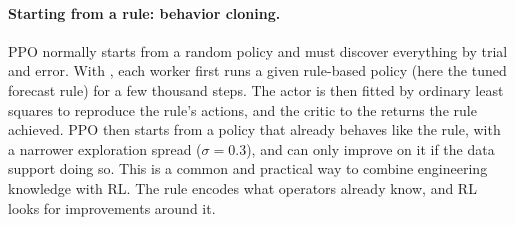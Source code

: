\paragraph{Starting from a rule: behavior cloning.} PPO normally starts from
a random policy and must discover everything by trial and error. With
, each worker first runs a given rule-based policy (here
the tuned forecast rule) for a few thousand steps. The actor is then fitted
by ordinary least squares to reproduce the rule's actions, and the critic
to the returns the rule achieved. PPO then starts from a policy that
already behaves like the rule, with a narrower exploration spread
($\sigma=0.3$), and can only improve on it if the data support doing so.
This is a common and practical way to combine engineering knowledge with
RL. The rule encodes what operators already know, and RL looks for
improvements around it.
